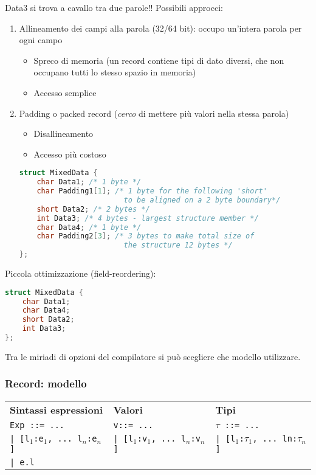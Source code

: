 \documentclass[a4paper,10pt]{article}
\begin{document}
Data3 si trova a cavallo tra due parole!! Possibili approcci:
\begin{enumerate}
 \item Allineamento dei campi alla parola (32/64 bit): occupo un'intera parola per ogni campo
 \begin{itemize}
  \item Spreco di memoria (un record contiene tipi di dato diversi, che non occupano tutti lo stesso spazio in memoria)
  \item Accesso semplice
 \end{itemize}
  \item Padding o packed record (\emph{cerco} di mettere più valori nella stessa parola)
 \begin{itemize}
  \item Disallineamento
  \item Accesso più costoso
 \end{itemize}
 \begin{lstlisting}[language=c]
struct MixedData {
    char Data1; /* 1 byte */
    char Padding1[1]; /* 1 byte for the following 'short'
                        to be aligned on a 2 byte boundary*/
    short Data2; /* 2 bytes */
    int Data3; /* 4 bytes - largest structure member */
    char Data4; /* 1 byte */
    char Padding2[3]; /* 3 bytes to make total size of
                        the structure 12 bytes */
};
\end{lstlisting}
\end{enumerate}


Piccola ottimizzazione (field-reordering):
\begin{lstlisting}[language = c]
struct MixedData {
    char Data1;
    char Data4;
    short Data2;
    int Data3;
};
\end{lstlisting}

Tra le miriadi di opzioni del compilatore si può scegliere che modello utilizzare.
\newpage
\subsubsection{Record: modello}
\renewcommand{\arraystretch}{1.5}
\begin{tabular}{|l|l|l|}
\hline
 \textbf{Sintassi espressioni} & \textbf{Valori} & \textbf{Tipi} \\
 \texttt{Exp ::=  ... } & \texttt{v::= ... } & \texttt{$\tau$ ::= ...}\\
 \texttt{| [l$_1$:e$_1$, ... l$_n$:e$_n$]} & \texttt{| [l$_1$:v$_1$, ... l$_n$:v$_n$]} & \texttt{| [l$_1$:$\tau_1$, ... ln:$\tau_n$]}\\
 \texttt{| e.l} & &\\
 \hline
 \end{tabular}
 \bigskip
 
\end{document}
